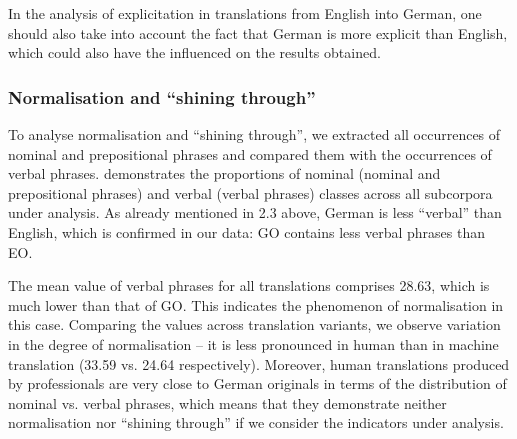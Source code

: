 \documentclass[output=paper]{LSP/langsci}
\begin{document}
In the analysis of explicitation in translations from English into German, one should also take into account the fact that German is more explicit than English, which could also have the influenced on the results obtained.

\subsubsection{Normalisation and “shining through”}
 
To analyse normalisation and “shining through”, we extracted all occurrences of nominal and prepositional phrases and compared them with the occurrences of verbal phrases.  demonstrates the proportions of nominal (nominal and prepositional phrases) and verbal (verbal phrases) classes across all subcorpora under analysis. As already mentioned in 2.3 above, German is less “verbal” than English, which is confirmed in our data: GO contains less verbal phrases than EO.

The mean value of verbal phrases for all translations comprises 28.63, which is much lower than that of GO. This indicates the phenomenon of normalisation in this case. Comparing the values across translation variants, we observe variation in the degree of normalisation – it is less pronounced in human than in machine translation (33.59 vs. 24.64 respectively).  Moreover, human translations produced by professionals are very close to German originals in terms of the distribution of nominal vs. verbal phrases, which means that they demonstrate neither normalisation nor “shining through” if we consider the indicators under analysis.
\end{document}
